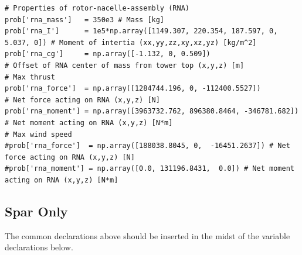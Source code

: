 \begin{lstlisting}
# Properties of rotor-nacelle-assembly (RNA)
prob['rna_mass']   = 350e3 # Mass [kg]
prob['rna_I']      = 1e5*np.array([1149.307, 220.354, 187.597, 0, 5.037, 0]) # Moment of intertia (xx,yy,zz,xy,xz,yz) [kg/m^2]
prob['rna_cg']     = np.array([-1.132, 0, 0.509])                       # Offset of RNA center of mass from tower top (x,y,z) [m]
# Max thrust
prob['rna_force']  = np.array([1284744.196, 0, -112400.5527])           # Net force acting on RNA (x,y,z) [N]
prob['rna_moment'] = np.array([3963732.762, 896380.8464, -346781.682]) # Net moment acting on RNA (x,y,z) [N*m]
# Max wind speed
#prob['rna_force']  = np.array([188038.8045, 0,  -16451.2637]) # Net force acting on RNA (x,y,z) [N]
#prob['rna_moment'] = np.array([0.0, 131196.8431,  0.0]) # Net moment acting on RNA (x,y,z) [N*m]
\end{lstlisting}

\subsection{Spar Only}
The common declarations above should be inserted in the midst of the
variable declarations below.

